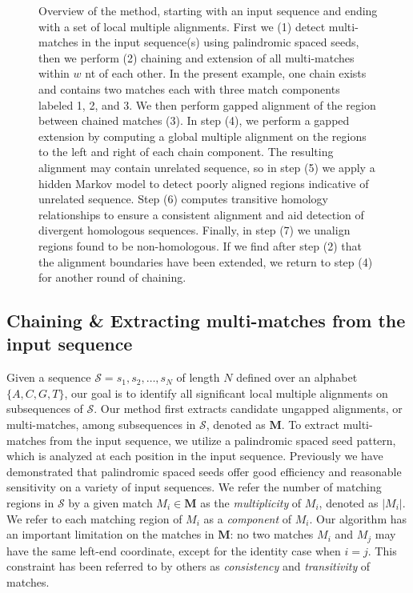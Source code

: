\documentclass{llncs}
\begin{document}
\begin{figure}[p]
\begin{center}
\end{center}
\vspace{-1.6cm}
\caption{Overview of the method, starting with an input sequence and ending
with a set of local multiple alignments. First we (1) detect
multi-matches in the input sequence(s) using palindromic spaced seeds,
then we perform (2) chaining and extension of all multi-matches within
$w$ nt of each other.  In the present example, one chain exists and
contains two matches each with three match components labeled 1, 2,
and 3.  We then perform gapped alignment of the region between chained
matches (3).  In step (4), we perform a gapped extension by computing
a global multiple alignment on the regions to the left and right of
each chain component.  The resulting alignment may contain unrelated
sequence, so in step (5) we apply a hidden Markov model to detect
poorly aligned regions indicative of unrelated sequence.  Step (6)
computes transitive homology relationships to ensure a consistent
alignment and aid detection of divergent homologous sequences.
Finally, in step (7) we unalign regions found to be non-homologous.
If we find after step (2) that the alignment boundaries have been
extended, we return to step (4) for another round of chaining.}
\label{fig-main}
\end{figure}

\subsection{Chaining \& Extracting multi-matches from the input sequence}
Given a sequence $\mathcal{S}=s_1, s_2,\dots, s_N$ of length $N$
defined over an alphabet $\{A,C,G,T\}$, our goal is to identify all
significant local multiple alignments on subsequences of
$\mathcal{S}$. Our method first extracts candidate ungapped
alignments, or multi-matches, among subsequences in $\mathcal{S}$,
denoted as $\mathbf{M}$. To extract multi-matches from the input
sequence, we utilize a palindromic spaced seed pattern\cite{ref-zhang}, which is
analyzed at each position in the input sequence.  Previously we have
demonstrated that palindromic spaced seeds offer good efficiency and
reasonable sensitivity on a variety of input
sequences\cite{ref-procrast}.  We refer the number of matching regions
in $\mathcal{S}$ by a given match $M_i \in \mathbf{M}$ as the
\textit{multiplicity} of $M_i$, denoted as $|M_i|$. We refer to each
matching region of $M_i$ as a \textit{component} of $M_i$. Our
algorithm has an important limitation on the matches in $\mathbf{M}$:
no two matches $M_i$ and $M_j$ may have the same left-end coordinate,
except for the identity case when $i=j$.  This constraint has been
referred to by others as \textit{consistency} and
\textit{transitivity}\cite{ref-transitivity} of matches.
\end{document}
